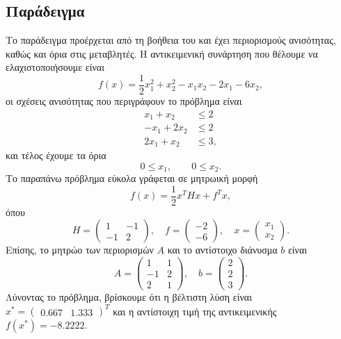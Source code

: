 \subsection{Παράδειγμα}
Το παράδειγμα προέρχεται από τη βοήθεια του  και έχει
περιορισμούς ανισότητας, καθώς και όρια στις μεταβλητές.
Η αντικειμενική συνάρτηση που θέλουμε να ελαχιστοποιήσουμε είναι
\begin{equation*}
    f(x) = \frac{1}{2}x_1^2 + x_2^2 - x_1x_2 -2x_1 - 6x_2,
\end{equation*}
οι σχέσεις ανισότητας που περιγράφουν το πρόβλημα είναι
\begin{align*}
    x_1 + x_2 &\leq 2 \\
    -x_1 + 2x_2 &\leq 2 \\
    2x_1 + x_2 &\leq 3,
\end{align*}
και τέλος έχουμε τα όρια
\begin{equation*}
    0 \leq x_1, \qquad 0 \leq x_2.
\end{equation*}
Το παραπάνω πρόβλημα εύκολα γράφεται σε μητρωική μορφή
\begin{equation*}
    f(x) = \dfrac{1}{2}x^THx + f^Tx,
\end{equation*}
όπου
\begin{equation*}
    H = \begin{pmatrix}1 & -1 \\-1 & 2\end{pmatrix},\quad
    f = \begin{pmatrix}-2\\-6\end{pmatrix},\quad
    x = \begin{pmatrix}x_1\\x_2\end{pmatrix}.
\end{equation*}
Επίσης, το μητρώο των περιορισμών $A$ και το αντίστοιχο διάνυσμα $b$ είναι
\begin{equation*}
    A = \begin{pmatrix}1 & 1\\-1 & 2\\2 & 1\end{pmatrix},\quad
    b = \begin{pmatrix}2\\2\\3\end{pmatrix}.
\end{equation*}
Λύνοντας το πρόβλημα, βρίσκουμε ότι η βέλτιστη λύση είναι
$x^* = \begin{pmatrix} 0.667 & 1.333 \end{pmatrix}^T$ και η αντίστοιχη
τιμή της αντικειμενικής $f(x^*) = -8.2222$.

